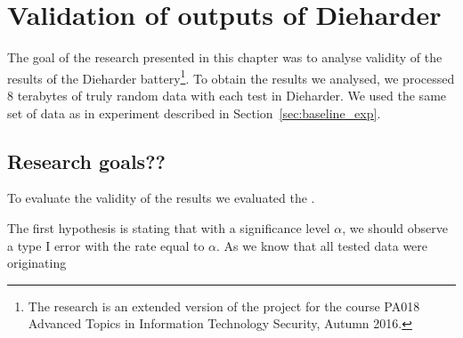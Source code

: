 \documentclass[
  digital,  	%
  color,		%
  oneside,   	%
  12pt,
  nocover,
  notable,
  nolof,
  nolot,
]{fithesis3}
\theoremstyle{definition}
\theoremstyle{remark}
\begin{document}
\chapter{Validation of outputs of Dieharder}
\label{chap:validating_dieharder}
The goal of the research presented in this chapter was to analyse validity of the results of the Dieharder battery\footnote{The research is an extended version of the project for the course PA018 Advanced Topics in Information Technology Security, Autumn 2016.}. To obtain the results we analysed, we processed 8 terabytes of truly random data with each test in Dieharder. We used the same set of data as in experiment described in Section~\ref{sec:baseline_exp}.

\section{Research goals??}
To evaluate the validity of the results we evaluated the .

The first hypothesis is stating that with a significance level $\alpha$, we should observe a type I error with the rate equal to $\alpha$. As we know that all tested data were originating
\end{document}
